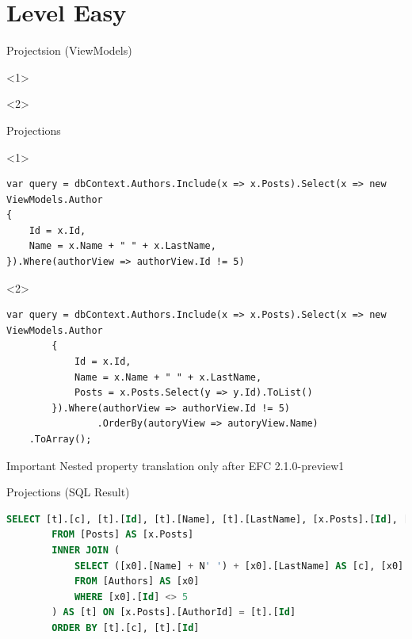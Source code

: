 \documentclass{bredelebeamer}
\begin{document}
\section{Level Easy}

\begin{frame}{Projectsion (ViewModels)}
    \begin{onlyenv}<1>
        
    \end{onlyenv}
    \begin{onlyenv}<2>
        
    \end{onlyenv}
    
\end{frame}

\begin{frame}[fragile]{Projections}
    \begin{onlyenv}<1>
        \begin{lstlisting}
var query = dbContext.Authors.Include(x => x.Posts).Select(x => new ViewModels.Author
{
    Id = x.Id,
    Name = x.Name + " " + x.LastName,
}).Where(authorView => authorView.Id != 5)
        \end{lstlisting}
    \end{onlyenv}
    \begin{onlyenv}<2>
        \begin{lstlisting}
var query = dbContext.Authors.Include(x => x.Posts).Select(x => new ViewModels.Author
        {
            Id = x.Id,
            Name = x.Name + " " + x.LastName,
            Posts = x.Posts.Select(y => y.Id).ToList()
        }).Where(authorView => authorView.Id != 5)
                .OrderBy(autoryView => autoryView.Name)
    .ToArray();
        \end{lstlisting}
        \begin{alertblock}{Important}
            Nested property translation only after EFC 2.1.0-preview1
        \end{alertblock}
    \end{onlyenv}
\end{frame}
\begin{frame}[fragile]{Projections (SQL Result)}
    \begin{lstlisting}[language=SQL]
        SELECT [t].[c], [t].[Id], [t].[Name], [t].[LastName], [x.Posts].[Id], [x.Posts].[AuthorId]
        FROM [Posts] AS [x.Posts]
        INNER JOIN (
            SELECT ([x0].[Name] + N' ') + [x0].[LastName] AS [c], [x0].[Id], [x0].[Name], [x0].[LastName]
            FROM [Authors] AS [x0]
            WHERE [x0].[Id] <> 5
        ) AS [t] ON [x.Posts].[AuthorId] = [t].[Id]
        ORDER BY [t].[c], [t].[Id]
    \end{lstlisting}
\end{frame}
\end{document}
